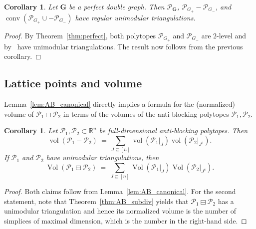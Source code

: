\documentclass[11pt]{amsart}
\newtheorem{cor}[thm]{Corollary}
\theoremstyle{definition}
\begin{document}
\begin{cor}
    Let ${\mathbf{G}}$ be a perfect double graph. Then ${\mathcal{P}}_{\mathbf{G}}$, ${\mathcal{P}}_{G_+} -
    {\mathcal{P}}_{G_-}$, and $\operatorname{conv}( {\mathcal{P}}_{G_+} \cup -{\mathcal{P}}_{G_-})$ have regular
    unimodular triangulations.
\end{cor}
\begin{proof}
    By Theorem~\ref{thm:perfect}, both polytopes ${\mathcal{P}}_{G_+}$ and ${\mathcal{P}}_{G_-}$
    are $2$-level and by~\cite[Thm.~2.4]{Sullivant} have
    unimodular triangulations. The result now follows from the previous
    corollary.
\end{proof}

\subsection{Lattice points and volume} \label{ssec:AB_ehrhart}

Lemma~\ref{lem:AB_canonical} directly implies a formula for the (normalized)
volume of ${{{{\mathcal{P}}_1} \boxminus {{\mathcal{P}}_2}}}$ in terms of the volumes of the
anti-blocking polytopes ${\mathcal{P}}_1,{\mathcal{P}}_2$.

\begin{cor}\label{cor:AB_volumes}
    Let ${\mathcal{P}}_1,{\mathcal{P}}_2 \subset {\mathbb{R}}^n$ be full-dimensional anti-blocking
    polytopes.  Then
    \[
        \operatorname{vol}({\mathcal{P}}_1 - {\mathcal{P}}_2) \ = \  \sum_{J \subseteq [n]} \operatorname{vol}({\mathcal{P}}_1|_J)
        \operatorname{vol}({\mathcal{P}}_2|_{J^c}).
    \]
    If ${\mathcal{P}}_1$ and ${\mathcal{P}}_2$ have unimodular triangulations, then 
    \[
        \operatorname{Vol}({{{{\mathcal{P}}_1} \boxminus {{\mathcal{P}}_2}}}) \ = \ 
        \sum_{J \subseteq [n]} 
        \operatorname{Vol}({\mathcal{P}}_1|_J)
        \operatorname{Vol}({\mathcal{P}}_2|_{J^c}).
    \]
\end{cor}
\begin{proof}
    Both claims follow from Lemma~\ref{lem:AB_canonical}.
    For the second statement, note that Theorem~\ref{thm:AB_subdiv} yields
    that ${{{{\mathcal{P}}_1} \boxminus {{\mathcal{P}}_2}}}$ has a unimodular triangulation and hence its
    normalized volume is the number of simplices of maximal dimension, which
    is the number in the right-hand side.
\end{proof}
\end{document}

